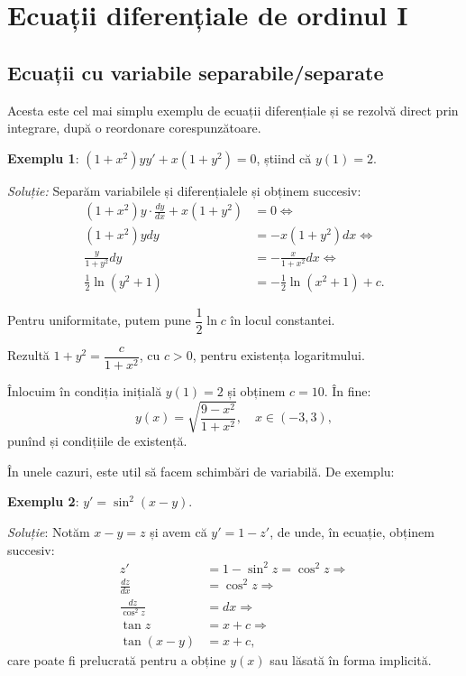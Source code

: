 
\chapter{Ecuații diferențiale de ordinul I}

\indent{}

\section{Ecuații cu variabile separabile/separate}
\label{sec:sep}

\indent\indent Acesta este cel mai simplu exemplu de ecuații diferențiale și se 
rezolvă direct prin integrare, după o reordonare corespunzătoare.

\textbf{Exemplu 1}: $(1 + x^2) yy' + x(1 + y^2) = 0$, știind că $y(1) = 2$.

\emph{Soluție:} Separăm variabilele și diferențialele și obținem succesiv:
\begin{align*}
  (1 + x^2) y \cdot \frac{dy}{dx} + x(1 + y^2) &= 0 \Leftrightarrow\\
  (1 + x^2) y dy &= -x(1 + y^2) dx \Leftrightarrow \\
  \frac{y}{1 + y^2} dy &= -\frac{x}{1 + x^2} dx \Leftrightarrow \\
  \frac{1}{2} \ln (y^2 + 1) &= -\frac{1}{2} \ln(x^2 + 1) + c.
\end{align*}

Pentru uniformitate, putem pune $\dfrac{1}{2} \ln c$ în locul constantei.

Rezultă $1 + y^2 = \dfrac{c}{1 + x^2}$, cu $c > 0$, pentru existența logaritmului.

Înlocuim în condiția inițială $y(1) = 2$ și obținem $c = 10$. În fine:
\[
  y(x) = \sqrt{\frac{9 - x^2}{1 + x^2}}, \quad x \in (-3, 3),
\]
punînd și condițiile de existență.

\vspace{0.5cm}

În unele cazuri, este util să facem schimbări de variabilă. De exemplu:

\textbf{Exemplu 2}: $y' = \sin^2(x - y)$.

\emph{Soluție}: Notăm $x - y = z$ și avem că $y' = 1 - z'$, de unde, în
ecuație, obținem succesiv:
\begin{align*}
  z' & = 1 - \sin^2 z = \cos^2 z \Rightarrow\\
  \frac{dz}{dx} &= \cos^2 z \Rightarrow \\
  \frac{dz}{\cos^2 z} &= dx \Rightarrow \\
  \tan z &= x + c \Rightarrow \\
  \tan (x - y) &= x + c,
\end{align*}
care poate fi prelucrată pentru a obține $y(x)$ sau lăsată în forma implicită.


